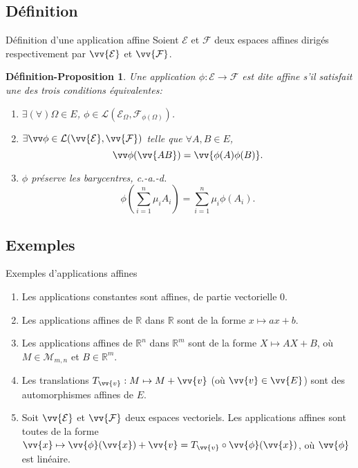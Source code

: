 \documentclass[aspectratio=1610 %
]{beamer}
\newtheorem{defprop}[theorem]{Définition-Proposition}
\let\ens\mathcal
\begin{document}
\subsection{Définition}
  \begin{frame}{Définition d'une application affine}
    Soient $\ens{E}$ et $\ens{F}$ deux espaces affines dirigés respectivement par $\vv{\ens{E}}$ et $\vv{\ens{F}}$.
    \begin{defprop}
      Une application $\phi:\ens{E}\rightarrow\ens{F}$ est dite \alert{affine} s'il satisfait une des trois conditions équivalentes:
      \begin{enumerate}[<+(1)->]
        \item $\exists(\forall) \Omega \in E$, $\phi\in\mathcal{L}(\ens{E}_{\Omega},\ens{F}_{\phi(\Omega)})$.
        \item $\exists \vv\phi \in \mathcal{L}(\vv{\ens{E}},\vv{\ens{F}})$ telle que $\forall A,B \in E$,
          $$
            \vv\phi(\vv{AB})=\vv{\phi(A)\phi(B)}.
          $$
        \item $\phi$ préserve les barycentres, c.-a.-d.
          $$
            \phi(\sum_{i=1}^{n}\mu_{i}A_{i})=\sum_{i=1}^{n}\mu_{i}\phi(A_{i}).
          $$
      \end{enumerate}
    \end{defprop}
  \end{frame}
\subsection{Exemples}
  \begin{frame}{Exemples d'applications affines}
    \begin{enumerate}[<+(1)->]
      \item Les applications constantes sont affines, de partie vectorielle $0$.
      \item Les applications affines de $\mathbb{R}$ dans $\mathbb{R}$ sont de la forme $x \mapsto ax+b$.
      \item Les applications affines de $\mathbb{R}^{n}$ dans $\mathbb{R}^{m}$ sont de la forme $X \mapsto AX+B$, où $M \in \mathcal{M}_{m,n}$ et $B \in \mathbb{R}^{m}$.
      \item Les translations $T_{\vv{v}}:M \mapsto M+\vv{v}$ (où $\vv{v} \in \vv{E}$) sont des automorphismes affines de $E$.
      \item Soit $\vv{\mathcal{E}}$ et $\vv{\mathcal{F}}$ deux espaces vectoriels. Les applications affines sont toutes de la forme $\vv{x} \mapsto \vv{\phi}(\vv{x}) + \vv{v}=T_{\vv{v}}\circ\vv{\phi}(\vv{x})$, où $\vv{\phi}$ est linéaire.
    \end{enumerate}
  \end{frame}
\end{document}
